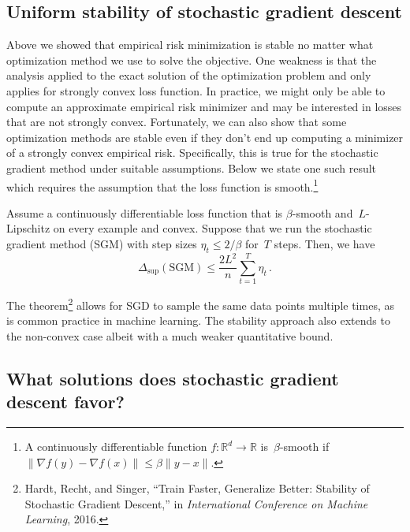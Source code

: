 \documentclass{tufte-book}
\begin{document}
\hypertarget{uniform-stability-of-stochastic-gradient-descent}{%
\subsection{Uniform stability of stochastic gradient
descent}\label{uniform-stability-of-stochastic-gradient-descent}}

Above we showed that empirical risk minimization is stable no matter
what optimization method we use to solve the objective. One weakness is
that the analysis applied to the exact solution of the optimization
problem and only applies for strongly convex loss function. In practice,
we might only be able to compute an approximate empirical risk minimizer
and may be interested in losses that are not strongly convex.
Fortunately, we can also show that some optimization methods are stable
even if they don't end up computing a minimizer of a strongly convex
empirical risk. Specifically, this is true for the stochastic gradient
method under suitable assumptions. Below we state one such result which
requires the assumption that the loss function is smooth.\footnote{A
  continuously differentiable function
  \(f\colon\mathbb{R}^d\to\mathbb{R}\) is~\(\beta\)-smooth if
  \(\|\nabla f(y)-\nabla f(x)\|\le \beta\|y-x\|.\)}

\begin{Theorem}

Assume a continuously differentiable loss function that is
\(\beta\)-smooth and~\(L\)-Lipschitz on every example and convex.
Suppose that we run the stochastic gradient method (SGM) with step sizes
\(\eta_t\le 2/\beta\) for~\(T\) steps. Then, we have \[
\Delta_{\mathrm{sup}} (\text{SGM}) \leq \frac{2L^2}{n}\sum_{t=1}^T\eta_t\,.
\]

\end{Theorem}

The theorem\footnote{Hardt, Recht, and Singer, {``Train Faster,
  Generalize Better: Stability of Stochastic Gradient Descent,''} in
  \emph{International Conference on Machine Learning}, 2016.} allows for
SGD to sample the same data points multiple times, as is common practice
in machine learning. The stability approach also extends to the
non-convex case albeit with a much weaker quantitative bound.

\hypertarget{what-solutions-does-stochastic-gradient-descent-favor}{%
\subsection{What solutions does stochastic gradient descent
favor?}\label{what-solutions-does-stochastic-gradient-descent-favor}}
\end{document}
